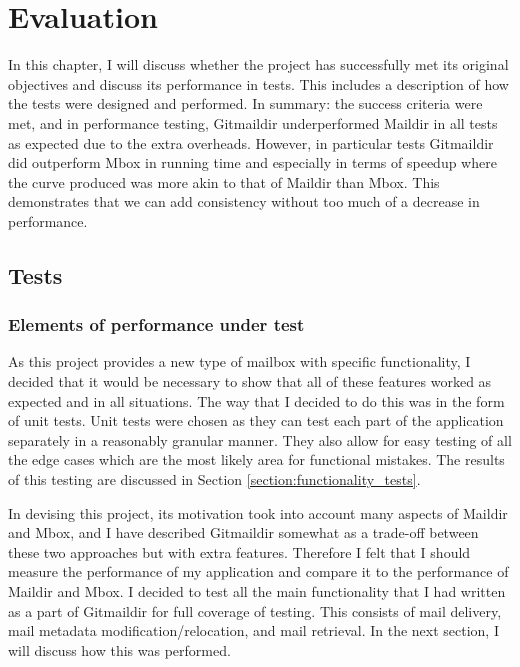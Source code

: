 \chapter{Evaluation} \label{section:evaluation}

In this chapter, I will discuss whether the project has successfully met its original objectives and discuss its performance in tests. This includes a description of how the tests were designed and performed. In summary: the success criteria were met, and in performance testing, Gitmaildir underperformed Maildir in all tests as expected due to the extra overheads. However, in particular tests Gitmaildir did outperform Mbox in running time and especially in terms of speedup where the curve produced was more akin to that of Maildir than Mbox. This demonstrates that we can add consistency without too much of a decrease in performance.

\section{Tests}

\subsection{Elements of performance under test}

As this project provides a new type of mailbox with specific functionality, I decided that it would be necessary to show that all of these features worked as expected and in all situations. The way that I decided to do this was in the form of unit tests. Unit tests were chosen as they can test each part of the application separately in a reasonably granular manner. They also allow for easy testing of all the edge cases which are the most likely area for functional mistakes. The results of this testing are discussed in Section \ref{section:functionality_tests}.

In devising this project, its motivation took into account many aspects of Maildir and Mbox, and I have described Gitmaildir somewhat as a trade-off between these two approaches but with extra features. Therefore I felt that I should measure the performance of my application and compare it to the performance of Maildir and Mbox. I decided to test all the main functionality that I had written as a part of Gitmaildir for full coverage of testing. This consists of mail delivery, mail metadata modification/relocation, and mail retrieval. In the next section, I will discuss how this was performed.

